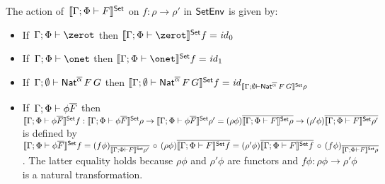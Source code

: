\documentclass[runningheads]{llncs}
\renewcommand{\id}{\mathit{id}}
\renewcommand{\id}{\mathit{id}}
\begin{document}
\begin{definition}\label{def:set-sem-funcs}
The action
of\, $\llbracket{\Gamma;\Phi \vdash F}\rrbracket^{\mathsf{Set}}$
on
$f : \rho \to \rho'$ in $\mathsf{SetEnv}$ is given by:
\begin{itemize}
\item If \,$\Gamma;\Phi \vdash \zerot$ then $\setsem{\Gamma;\Phi \vdash
  \zerot}f = \id_0$
\item If \,$\Gamma;\Phi \vdash \onet$ then $\setsem{\Gamma;\Phi \vdash
  \onet}f = \id_1$
\item If \,$\Gamma; \emptyset
  \vdash \mathsf{Nat}^{\overline{\alpha}}\,F\,G$ then
  $\setsem{\Gamma; \emptyset
    \vdash \Nat^{\ol{\alpha}}\,F\,G} f =
  \id_{\setsem{\Gamma; \emptyset
      \vdash \Nat^{\ol{\alpha}}\,F\,G}\rho}$
\item If \,$\Gamma;\Phi \vdash \phi \overline{F}$ then
$\llbracket{\Gamma;\Phi \vdash \phi \overline{F}}\rrbracket^{\mathsf{Set}} f : \llbracket{\Gamma;\Phi
  \vdash \phi \overline{F}}\rrbracket^{\mathsf{Set}}\rho \to \llbracket{\Gamma;\Phi \vdash
  \phi\overline{F}}\rrbracket^{\mathsf{Set}}\rho' = (\rho\phi) \overline{\llbracket{\Gamma;\Phi \vdash
    F}\rrbracket^{\mathsf{Set}}\rho} \to (\rho'\phi) \overline{\llbracket{\Gamma;\Phi \vdash
    F}\rrbracket^{\mathsf{Set}}\rho'}$ is defined by $\llbracket{\Gamma;\Phi \vdash \phi
  \overline{F}}\rrbracket^{\mathsf{Set}} f = (f\phi)_{\overline{\llbracket{\Gamma;\Phi \vdash
      F}\rrbracket^{\mathsf{Set}}\rho'}}\, \circ\, (\rho\phi) {\overline{\llbracket{\Gamma;\Phi
      \vdash F}\rrbracket^{\mathsf{Set}} f}} = (\rho'\phi) {\overline{\llbracket{\Gamma;\Phi \vdash
      F}\rrbracket^{\mathsf{Set}} f}}\, \circ\, (f \phi)_{\overline{\llbracket{\Gamma;\Phi \vdash
      F}\rrbracket^{\mathsf{Set}}\rho}}$.  The latter equality holds because $\rho\phi$ and
  $\rho'\phi$ are functors and $f\phi : \rho\phi \to \rho'\phi$ is a
  natural transformation.

\end{itemize}
\end{definition}
\end{document}
